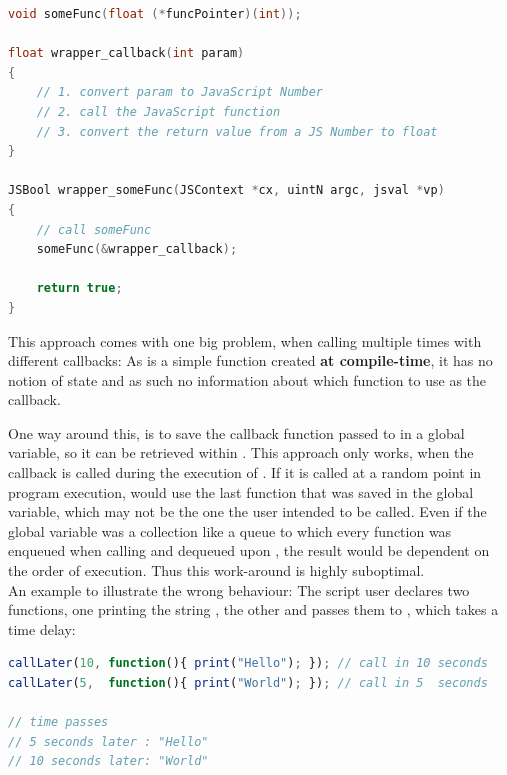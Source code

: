 \SingleSpacing
\begin{lstlisting}[language=C++, caption=Wrapper code for handling methods that take function pointers \#1, label=lst:FuncPointer]
void someFunc(float (*funcPointer)(int));

float wrapper_callback(int param)
{
	// 1. convert param to JavaScript Number
	// 2. call the JavaScript function
	// 3. convert the return value from a JS Number to float
}

JSBool wrapper_someFunc(JSContext *cx, uintN argc, jsval *vp)
{
	// call someFunc
	someFunc(&wrapper_callback);
	
	return true;
}
\end{lstlisting}
\OnehalfSpacing

This approach comes with one big problem, when calling  multiple times with different  callbacks: As  is a simple  function created \textbf{at compile-time}, it has no notion of state and as such no information about which  function to use as the callback.

One way around this, is to save the  callback function passed to \linebreak{} in a global variable, so it can be retrieved within . This approach only works, when the callback is called during the execution of . If it is called at a random point in program execution,  would use the last  function that was saved in the global variable, which may not be the one the user intended to be called. Even if the global variable was a collection like a queue to which every  function was enqueued when calling  and dequeued upon , the result would be dependent on the order of execution. Thus this work-around is highly suboptimal.\\
An example to illustrate the wrong behaviour: The script user declares two  functions, one printing the string , the other  and passes them to \linebreak{}, which takes a time delay:

\SingleSpacing
\begin{lstlisting}[language=JavaScript, caption=Passing a callback function]
callLater(10, function(){ print("Hello"); }); // call in 10 seconds
callLater(5,  function(){ print("World"); }); // call in 5  seconds

// time passes
// 5 seconds later : "Hello"
// 10 seconds later: "World"
\end{lstlisting}
\OnehalfSpacing

